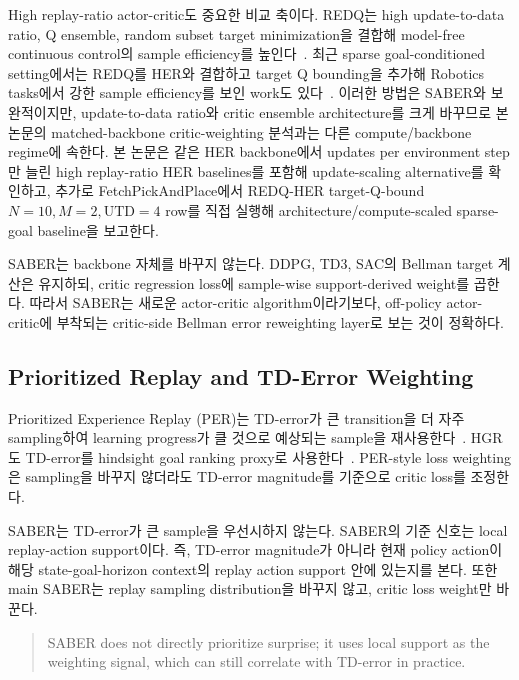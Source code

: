 \documentclass[letterpaper]{article}
\begin{document}
High replay-ratio actor-critic도 중요한 비교 축이다. REDQ는 high update-to-data ratio, Q ensemble, random subset target minimization을 결합해 model-free continuous control의 sample efficiency를 높인다~\citep{chen2021redq}. 최근 sparse goal-conditioned setting에서는 REDQ를 HER와 결합하고 target Q bounding을 추가해 Robotics tasks에서 강한 sample efficiency를 보인 work도 있다~\citep{hiraoka2023sparsegoalredq}. 이러한 방법은 SABER와 보완적이지만, update-to-data ratio와 critic ensemble architecture를 크게 바꾸므로 본 논문의 matched-backbone critic-weighting 분석과는 다른 compute/backbone regime에 속한다. 본 논문은 같은 HER backbone에서 updates per environment step만 늘린 high replay-ratio HER baselines를 포함해 update-scaling alternative를 확인하고, 추가로 FetchPickAndPlace에서 REDQ-HER target-Q-bound \(N=10,M=2,\mathrm{UTD}=4\) row를 직접 실행해 architecture/compute-scaled sparse-goal baseline을 보고한다.

SABER는 backbone 자체를 바꾸지 않는다. DDPG, TD3, SAC의 Bellman target 계산은 유지하되, critic regression loss에 sample-wise support-derived weight를 곱한다. 따라서 SABER는 새로운 actor-critic algorithm이라기보다, off-policy actor-critic에 부착되는 critic-side Bellman error reweighting layer로 보는 것이 정확하다.

\subsection{Prioritized Replay and TD-Error Weighting}

Prioritized Experience Replay (PER)는 TD-error가 큰 transition을 더 자주 sampling하여 learning progress가 클 것으로 예상되는 sample을 재사용한다~\citep{schaul2015per}. HGR도 TD-error를 hindsight goal ranking proxy로 사용한다~\citep{luu2021hgr}. PER-style loss weighting은 sampling을 바꾸지 않더라도 TD-error magnitude를 기준으로 critic loss를 조정한다.

SABER는 TD-error가 큰 sample을 우선시하지 않는다. SABER의 기준 신호는 local replay-action support이다. 즉, TD-error magnitude가 아니라 현재 policy action이 해당 state-goal-horizon context의 replay action support 안에 있는지를 본다. 또한 main SABER는 replay sampling distribution을 바꾸지 않고, critic loss weight만 바꾼다.

\begin{quote}
SABER does not directly prioritize surprise; it uses local support as the weighting signal, which can still correlate with TD-error in practice.
\end{quote}
\end{document}
